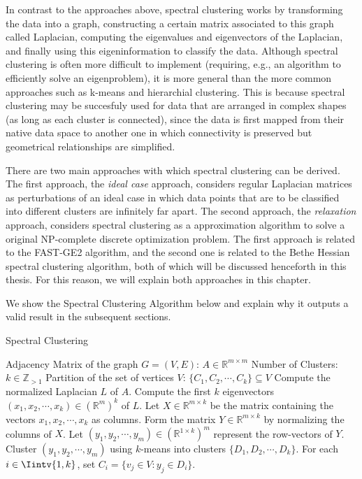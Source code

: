In contrast to the approaches above, spectral clustering works by transforming the data into a graph, constructing a certain matrix associated to this graph called Laplacian, computing the eigenvalues and eigenvectors of the Laplacian, and finally using this eigeninformation to classify the data.
Although spectral clustering is often more difficult to implement (requiring, e.g., an algorithm to efficiently solve an eigenproblem), it is more general than the more common approaches such as k-means and hierarchial clustering.
This is because spectral clustering may be succesfuly used for data that are arranged in complex shapes (as long as each cluster is connected), since the data is first mapped from their native data space to another one in which connectivity is preserved but geometrical relationships are simplified.

There are two main approaches with which spectral clustering can be derived.
The first approach, the \textit{ideal case} approach, considers regular Laplacian matrices as perturbations of an ideal case in which data points that are to be classified into different clusters are infinitely far apart.
The second approach, the \textit{relaxation} approach, considers spectral clustering as a approximation algorithm to solve a original NP-complete discrete optimization problem.
The first approach is related to the FAST-GE2 algorithm, and the second one is related to the Bethe Hessian spectral clustering algorithm, both of which will be discussed henceforth in this thesis.
For this reason, we will explain both approaches in this chapter.

We show the Spectral Clustering Algorithm below and explain why it outputs a valid result in the subsequent sections.

\begin{algorithm}
\caption{Spectral Clustering}\label{spectral_clustering}
\begin{algorithmic}[1]
   \Require 
      \Statex Adjacency Matrix of the graph $G = (V,E)$: $A \in \mathbb R ^ {m \times m}$ 
      \Statex Number of Clusters: $k \in \mathbb Z_{>1}$
   \Ensure 
      \Statex Partition of the set of vertices $V$: $\{ C_1, C_2, \cdots, C_k \} \subseteq V$
   \State Compute the normalized Laplacian $L$ of $A$.
   \State Compute the first $k$ eigenvectors $(x_1, x_2, \cdots, x_k) \in (\mathbb R^{m})^k$ of $L$.
   \State Let $X \in \mathbb R^{m \times k}$ be the matrix containing the vectors $x_1, x_2, \cdots, x_k$ as columns.
   \State Form the matrix $Y \in \mathbb R^{m \times k}$ by normalizing the columns of $X$.
   \State Let $(y_1, y_2, \cdots, y_m) \in ( \mathbb R^{1 \times k} )^m$ represent the row-vectors of $Y$.
   \State Cluster $(y_1, y_2, \cdots, y_m)$ using $k$-means into clusters $\{ D_1, D_2, \cdots, D_k \} $.
   \State For each $i \in \Iintv{1,k}$, set $C_i = \{ v_j \in V: y_j \in D_i \}$.
\end{algorithmic}
\end{algorithm}




